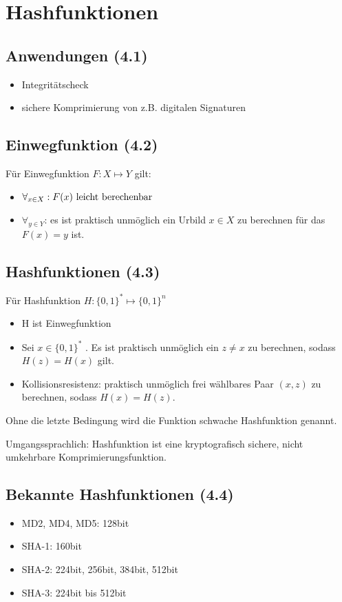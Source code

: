 \chapter{Hashfunktionen}
\section{Anwendungen (4.1)}
\begin{itemize}
  \item Integritätscheck
  \item sichere Komprimierung von z.B. digitalen Signaturen
\end{itemize}

\section{Einwegfunktion (4.2)}
Für Einwegfunktion $F: X \mapsto Y$ gilt:
\begin{itemize}
  \item $\forall_{x \in X} : F(x) \textnormal{ leicht berechenbar}$
  \item $\forall_{y \in Y}$: es ist praktisch unmöglich ein Urbild $x \in X$ zu berechnen für das $F(x) = y $ ist.
\end{itemize}

\section{Hashfunktionen (4.3)}
Für Hashfunktion $H: \{0,1\}^* \mapsto \{0,1\}^n$
\begin{itemize}
  \item H ist Einwegfunktion
  \item Sei $x \in \{0,1\}^*$ . Es ist praktisch unmöglich ein $z \neq x$ zu berechnen, sodass $H(z) = H(x)$ gilt.
  \item Kollisionsresistenz: praktisch unmöglich frei wählbares Paar $(x,z)$ zu berechnen, sodass $H(x) = H(z)$.
\end{itemize}
Ohne die letzte Bedingung wird die Funktion schwache Hashfunktion genannt.

Umgangssprachlich: Hashfunktion ist eine kryptografisch sichere, nicht umkehrbare Komprimierungsfunktion.

\section{Bekannte Hashfunktionen (4.4)}
\begin{itemize}
  \item MD2, MD4, MD5: 128bit
  \item SHA-1: 160bit
  \item SHA-2: 224bit, 256bit, 384bit, 512bit
  \item SHA-3: 224bit bis 512bit
\end{itemize}

